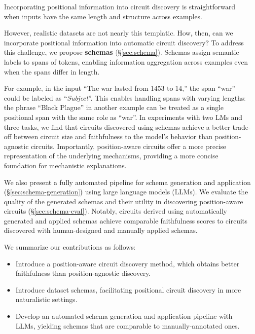 Incorporating positional information into circuit discovery is straightforward when inputs have the same length and structure across examples.

However, realistic datasets are not nearly this templatic.
How, then, can we incorporate positional information into automatic circuit discovery?
To address this challenge, we propose \textbf{schemas} (\S\ref{sec:schema}). 
Schemas assign semantic labels to spans of tokens, enabling information aggregation across examples even when the spans differ in length.

For example, in the input ``The \textcolor{positional}{war} lasted from 1453 to 14\underline{\hspace{1em}},'' the span ``\textcolor{positional}{war}'' could be labeled as ``\emph{Subject}''.
This enables handling spans with varying lengths: the phrase ``\textcolor{positional}{Black Plague}'' in another example can be treated as a single positional span with the same role as ``\textcolor{positional}{war}''.
In experiments with two LMs and three tasks, we find that circuits discovered using schemas achieve a better trade-off between circuit size and faithfulness to the model's behavior than position-agnostic circuits.
Importantly, position-aware circuits offer a more precise representation of the underlying mechanisms, providing a more concise foundation for mechanistic explanations.

We also present a fully automated pipeline for schema generation and application (\S\ref{sec:schema-generation}) using large language models (LLMs). 
We evaluate the quality of the generated schemas and their utility in discovering position-aware circuits (\S\ref{sec:schema-eval}).
Notably, circuits derived using automatically generated and applied schemas achieve comparable faithfulness scores to circuits discovered with human-designed and manually applied schemas.

We summarize our contributions as follows:
\begin{itemize}[noitemsep,leftmargin=*,topsep=1pt,parsep=1pt]
    \item Introduce a position-aware circuit discovery method, which obtains better faithfulness than position-agnostic discovery.  
    \item Introduce dataset schemas,  facilitating positional circuit discovery in more naturalistic settings. 
    \item Develop an automated schema generation and application pipeline with LLMs, yielding schemas that are comparable to manually-annotated ones.
\end{itemize}
